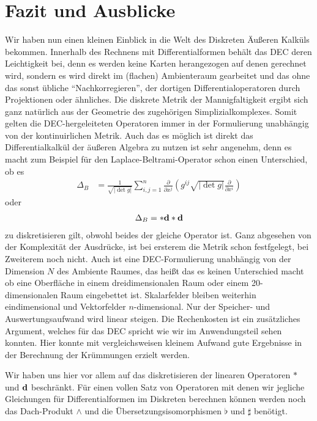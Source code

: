 \chapter{Fazit und Ausblicke}

Wir haben nun einen kleinen Einblick in die Welt des Diskreten Äußeren Kalküls bekommen.
Innerhalb des Rechnens mit Differentialformen behält das DEC deren Leichtigkeit bei,
denn es werden keine Karten herangezogen auf denen gerechnet wird, sondern es wird direkt im (flachen) Ambienteraum gearbeitet und das ohne
das sonst übliche "`Nachkorregieren"', der dortigen Differentialoperatoren durch Projektionen oder ähnliches.
Die diskrete Metrik der Mannigfaltigkeit ergibt sich ganz natürlich aus der Geometrie des zugehörigen Simplizialkomplexes.
Somit gelten die DEC-hergeleiteten Operatoren immer in der Formulierung unabhängig von der kontinuirlichen Metrik.
Auch das es möglich ist direkt das Differentialkalkül der äußeren Algebra zu nutzen ist sehr angenehm, denn es macht zum Beispiel für den
Laplace-Beltrami-Operator schon einen Unterschied, ob es 
    \begin{align}
      \Delta_{B} &= \frac{1}{\sqrt{\left| \det g \right|}} \sum_{i,j=1}^{n} \frac{\partial}{\partial x^{j}} \left( g^{ij}\sqrt{\left| \det g \right|} \frac{\partial }{\partial x^{i}}
      \right)
    \end{align}
oder
  \begin{align}
    \Delta_{B} = *\mathbf{d} *\mathbf{d}
  \end{align}
zu diskretisieren gilt, obwohl beides der gleiche Operator ist.
Ganz abgesehen von der Komplexität der Ausdrücke, ist bei ersterem die Metrik schon festfgelegt, bei Zweiterem noch nicht.
Auch ist eine DEC-Formulierung unabhängig von der Dimension \( N \) des Ambiente Raumes, das heißt das es keinen Unterschied macht ob eine
Oberfläche in einem dreidimensionalen Raum oder einem 20-dimensionalen Raum eingebettet ist.
Skalarfelder bleiben weiterhin eindimensional und Vektorfelder \( n \)-dimensional.
Nur der Speicher- und Auswertungsaufwand wird linear steigen.
Die Rechenkosten ist ein zusätzliches Argument, welches für das DEC spricht wie wir im Anwendungsteil sehen konnten.
Hier konnte mit vergleichsweisen kleinem Aufwand gute Ergebnisse in der Berechnung der Krümmungen erzielt werden.

Wir haben uns hier vor allem auf das diskretisieren der linearen Operatoren \( * \) und \( \mathbf{d} \) beschränkt.
Für einen vollen Satz von Operatoren mit denen wir jegliche Gleichungen für Differentialformen im Diskreten berechnen können werden noch
das Dach-Produkt \( \wedge  \) und die Übersetzungsisomorphismen \( \flat \) und \( \sharp \) benötigt.

